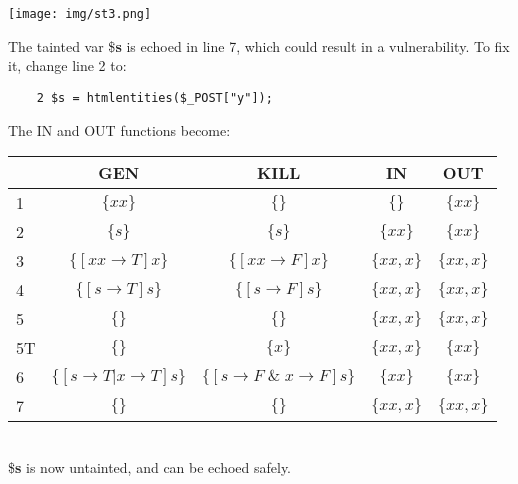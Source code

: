 \documentclass[a4paper, 10pt, titlepage]{article}
\begin{document}
\begin{center}
\texttt{[image: img/st3.png]}
\end{center}
The tainted var \$\textbf{s} is echoed in line 7, which could result in a vulnerability. To fix it, change line 2 to:
\begin{lstlisting}
	2 $s = htmlentities($_POST["y"]);
\end{lstlisting}
The IN and OUT functions become: \medskip\\
\begin{tabular}{|l|c|c|c|c|}\hline
 & GEN & KILL & IN & OUT \\ \hline
1 & $\{xx\}$ & $\{\}$ & $\{\}$ & $\{xx\}$\\
2 & $\{s\}$ & $\{s\}$ & $\{xx\}$ & $\{xx\}$\\
3 & $\{[xx \rightarrow T]x\}$ & $\{[xx \rightarrow F]x\}$ & $\{xx,x\}$ & $\{xx, x\}$\\
4 & $\{[s \rightarrow T]s\}$ & $\{[s \rightarrow F]s\}$ & $\{xx, x\}$ & $\{xx, x\}$\\
5 & $\{\}$ & $\{\}$ & $\{xx, x\}$ & $\{xx, x\}$\\
5T & $\{\}$ & $\{x\}$ & $\{xx, x\}$ & $\{xx\}$\\
6 & $\{[s \rightarrow T | x \rightarrow T]s\}$ & $\{[s \rightarrow F \; \& \; x \rightarrow F]s\}$ & $\{xx\}$ & $\{xx\}$\\
7 & $\{\}$ & $\{\}$ & $\{xx, x\}$ & $\{xx, x\}$\\ \hline
\end{tabular} \medskip\\
\$\textbf{s} is now untainted, and can be echoed safely.

\newpage
\end{document}

